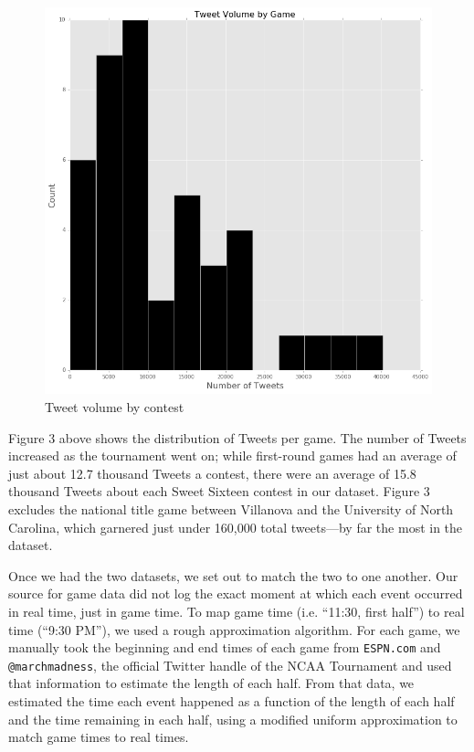 \documentclass[12pt]{article}
\begin{document}
\begin{doublespacing}
\begin{figure} [H]
	\centering
	\includegraphics[scale = 0.4] {Images/TweetVolumeByGame.png} 
	\caption{Tweet volume by contest}
\end{figure}

Figure 3 above shows the distribution of Tweets per game. The number of Tweets increased as the tournament went on; while first-round games had an average of just about 12.7 thousand Tweets a contest, there were an average of 15.8 thousand Tweets about each Sweet Sixteen contest in our dataset. Figure 3 excludes the national title game between Villanova and the University of North Carolina, which garnered just under 160,000 total tweets---by far the most in the dataset. 

Once we had the two datasets, we set out to match the two to one another. Our source for game data did not log the exact moment at which each event occurred in real time, just in game time. To map game time (i.e. ``11:30, first half'') to real time (``9:30 PM''), we used a rough approximation algorithm. For each game, we manually took the beginning and end times of each game from \texttt{ESPN.com} and \texttt{@marchmadness}, the official Twitter handle of the NCAA Tournament and used that information to estimate the length of each half. From that data, we estimated the time each event happened as a function of the length of each half and the time remaining in each half, using a modified uniform approximation to match game times to real times. 


\end{doublespacing}
\end{document}
